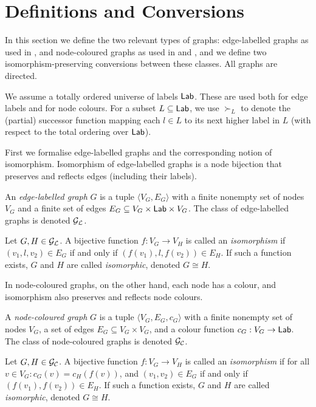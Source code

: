 \section{Definitions and Conversions}

In this section we define the two relevant types of graphs: edge-labelled
graphs as used in \GROOVE, and node-coloured graphs as used in \NAUTY and
\BLISS, and we define two isomorphism-preserving conversions between these
classes. All graphs are directed.

We assume a totally ordered universe of labels $\mathsf{Lab}$. These are used both for
edge labels and for node colours. For a subset $L\subseteq \mathsf{Lab}$, we use
$\succ_L$ to denote the (partial) successor function mapping each $l\in L$ to
its next higher label in $L$ (with respect to the total ordering over $\mathsf{Lab}$).

First we formalise edge-labelled graphs and the corresponding notion of
isomorphism. Isomorphism of edge-labelled graphs is a node bijection that
preserves and reflects edges (including their labels).

\begin{definition}
  An \emph{edge-labelled graph} $G$ is a tuple $\langle V_G, E_G
  \rangle$ with a finite nonempty set of nodes $V_G$ and a finite set of edges
  $E_G \subseteq V_G \times \mathsf{Lab} \times V_G$.  The class of edge-labelled
  graphs is denoted $\mathcal{G_L}$.
\end{definition}

\begin{definition}
  Let $G, H \in \mathcal{G_L}$. A bijective function $f: V_G \rightarrow V_H$ is called
  an \emph{isomorphism} if $(v_1,l,v_2) \in E_G$ if and only if
  $(f(v_1),l,f(v_2)) \in E_H$. If such a function exists, $G$ and $H$ are
  called \emph{isomorphic}, denoted $G \cong H$.
\end{definition}
%
In node-coloured graphs, on the other hand, each node has a colour, and
isomorphism also preserves and reflects node colours.

\begin{definition}
  A \emph{node-coloured graph} $G$ is a tuple $\langle V_G, E_G, c_G
  \rangle$ with a finite nonempty set of nodes $V_G$, a set of edges $E_G
  \subseteq V_G \times V_G$, and a colour function $c_G : V_G \rightarrow \mathsf{Lab}$.
  The class of node-coloured graphs is denoted $\mathcal{G_C}$.
\end{definition}

\begin{definition}
  Let $G, H \in \mathcal{G_C}$. A bijective function $f: V_G \rightarrow V_H$ is called
  an \emph{isomorphism} if for all $v \in V_G : c_G(v) = c_H(f(v))$, and
  $(v_1,v_2) \in E_G$ if and only if $(f(v_1),f(v_2)) \in E_H$. If such a
  function exists, $G$ and $H$ are called \emph{isomorphic}, denoted $G \cong
  H$.
\end{definition}

